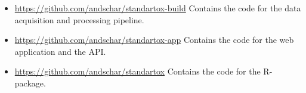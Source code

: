 \begin{itemize}

\item \url{https://github.com/andschar/standartox-build} \newline
Contains the code for the data acquisition and processing pipeline.

\item \url{https://github.com/andschar/standartox-app} \newline
Contains the code for the web application and the API.

\item \url{https://github.com/andschar/standartox} \newline
Contains the code for the R-package.

\end{itemize}




